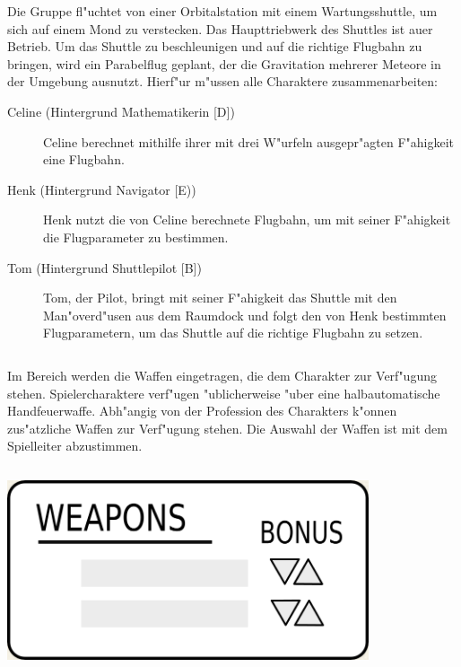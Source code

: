 \medskip
\begin{ruleexample}
    Die Gruppe fl"uchtet von einer Orbitalstation mit einem Wartungsshuttle, um sich auf einem Mond zu verstecken. Das Haupttriebwerk des Shuttles ist au\3er Betrieb. Um das Shuttle zu beschleunigen und auf die richtige Flugbahn zu bringen, wird ein Parabelflug geplant, der die Gravitation mehrerer Meteore in der Umgebung ausnutzt. Hierf"ur m"ussen alle Charaktere zusammenarbeiten:

\begin{description}
        \item[Celine ({Hintergrund Mathematikerin [D]})] Celine berechnet mithilfe ihrer mit drei W"urfeln ausgepr"agten F"ahigkeit 
             eine Flugbahn.
        \item[Henk ({Hintergrund Navigator [E)})] Henk nutzt die von Celine berechnete Flugbahn, um mit seiner F"ahigkeit  
            die Flugparameter zu bestimmen.
        \item[Tom ({Hintergrund Shuttlepilot [B]})] Tom, der Pilot, bringt mit seiner F"ahigkeit  das Shuttle mit den 
            Man"overd"usen aus dem Raumdock und folgt den von Henk bestimmten Flugparametern, um das Shuttle auf die richtige Flugbahn zu setzen.
    \end{description}
\end{ruleexample}

\begin{column}[l]{0.55}
    Im Bereich  werden die Waffen eingetragen, die dem Charakter zur Verf"ugung stehen. Spielercharaktere verf"ugen "ublicherweise "uber eine halbautomatische Handfeuerwaffe. Abh"angig von der Profession des Charakters k"onnen zus"atzliche Waffen zur Verf"ugung stehen. Die Auswahl der Waffen ist mit dem Spielleiter abzustimmen.
\end{column}
\begin{column}[r]{0.45}
    \centering
    \includegraphics[width=0.80\textwidth]{images/character_weapons.jpg}
\end{column}
\medskip

